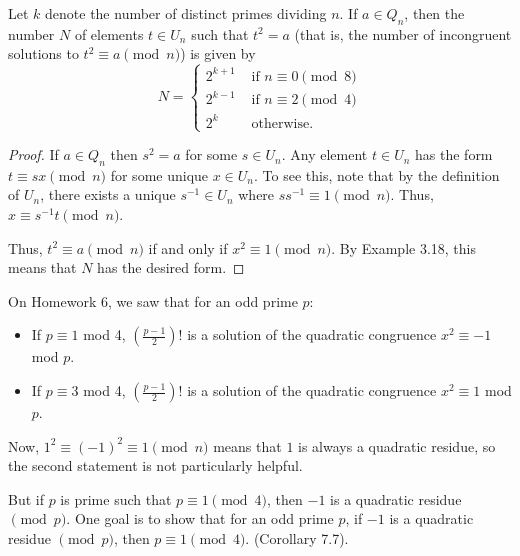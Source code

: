 \documentclass[letterpaper, 11 pt]{article}
\begin{document}
\begin{lem}[Lemma 7.1] Let $k$ denote the number of distinct primes dividing $n$. If $a\in Q_n$, then the number $N$ of elements $t\in U_n$ such that $t^2=a$ (that is, the number of incongruent solutions to $t^2\equiv a \pmod n$) is given by
\[N=
\begin{cases}
 2^{k+1} &\textrm{ if $n\equiv 0 \pmod 8$}\\
  2^{k-1} &\textrm{ if $n\equiv 2 \pmod 4$}\\
  2^{k} &\textrm{ otherwise}.
\end{cases}\]
\end{lem}
\begin{proof}
 If $a\in Q_n$ then $s^2=a$ for some $s\in U_n$. Any element $t\in U_n$ has the form $t\equiv sx \pmod n$ for some unique $x\in U_n$. To see this, note that by the definition of $U_n$, there exists a unique $s^{-1}\in U_n$ where $s s^{-1}\equiv 1 \pmod n$. Thus, $x\equiv s^{-1}t\pmod n$.
 
 Thus, $t^2\equiv a \pmod n$ if and only if $x^2\equiv 1 \pmod n$. By Example 3.18, this means that $N$ has the desired form.
\end{proof}

 On Homework 6, we saw that for an odd prime $p$:
\begin{itemize}
 		\item If $p\equiv1$ mod 4, $\left(\frac{p-1}{2}\right)!$ is a solution of the quadratic congruence $x^2\equiv -1$ mod $p$.
		\item If $p\equiv3$ mod 4, $\left(\frac{p-1}{2}\right)!$ is a solution of the quadratic congruence $x^2\equiv 1$ mod $p$.
\end{itemize}

Now, $1^2\equiv (-1)^2\equiv 1 \pmod n$ means that $1$ is always a quadratic residue, so the second statement is not particularly helpful. 

But if $p$ is prime such that $p \equiv 1 \pmod 4$, then $-1$ is a quadratic residue $\pmod p$. One goal is to show that for an odd prime $p$, if $-1$ is a quadratic residue $\pmod p$, then $p\equiv 1 \pmod 4$. (Corollary 7.7).
\end{document}
